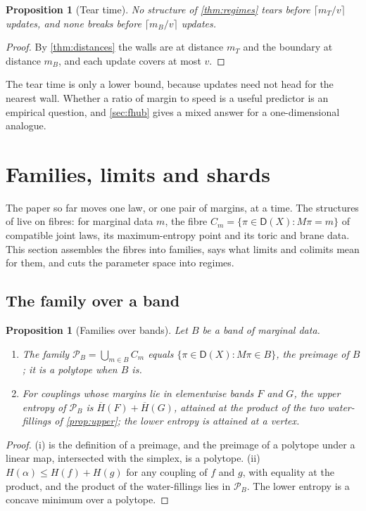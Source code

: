 \documentclass[11pt]{article}
\newtheorem{proposition}[theorem]{Proposition}
\theoremstyle{definition}
\theoremstyle{remark}
\newcommand{\D}{\mathsf{D}}
\newcommand{\Hup}{\overline{H}}
\begin{document}
\begin{proposition}[Tear time]\label{prop:teartime}
No structure of \cref{thm:regimes} tears before $\lceil m_T/v\rceil$ updates, and none breaks before $\lceil m_B/v\rceil$ updates.
\end{proposition}
\begin{proof}
By \cref{thm:distances} the walls are at distance $m_T$ and the boundary at distance $m_B$, and each update covers at most $v$.
\end{proof}

The tear time is only a lower bound, because updates need not head for the nearest wall. Whether a ratio of margin to speed is
a useful predictor is an empirical question, and \cref{sec:fhub} gives a mixed answer for a one-dimensional analogue.

\section{Families, limits and shards}\label{sec:families}

The paper so far moves one law, or one pair of margins, at a time. The structures of \cite{Bridges} live on fibres: for marginal
data $m$, the fibre $C_m=\{\pi\in\D(X):M\pi=m\}$ of compatible joint laws, its maximum-entropy point and its toric and brane data.
This section assembles the fibres into families, says what limits and colimits mean for them, and cuts the parameter space into
regimes.

\subsection{The family over a band}

\begin{proposition}[Families over bands]\label{prop:family}
Let $B$ be a band of marginal data.
\begin{enumerate}[label=(\roman*)]
\item The family $\mathcal P_B=\bigcup_{m\in B}C_m$ equals $\{\pi\in\D(X):M\pi\in B\}$, the preimage of $B$; it is a polytope when $B$ is.
\item For couplings whose margins lie in elementwise bands $F$ and $G$, the upper entropy of $\mathcal P_B$ is $\Hup(F)+\Hup(G)$, attained at
  the product of the two water-fillings of \cref{prop:upper}; the lower entropy is attained at a vertex.
\end{enumerate}
\end{proposition}
\begin{proof}
(i) is the definition of a preimage, and the preimage of a polytope under a linear map, intersected with the simplex, is a polytope.
(ii) $H(\alpha)\le H(f)+H(g)$ for any coupling of $f$ and $g$, with equality at the product, and the product of the water-fillings lies
in $\mathcal P_B$. The lower entropy is a concave minimum over a polytope.
\end{proof}
\end{document}
